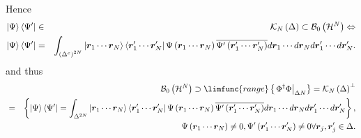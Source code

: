 \documentclass[12pt]{article}
\begin{document}
Hence%
\begin{eqnarray}
\left\vert \Psi \right\rangle \left\langle \Psi ^{\prime }\right\vert  &\in &%
\mathcal{K}_{N}\left( \Delta \right) \subset \mathcal{B}_{0}\left( \mathcal{H%
}^{N}\right) \Leftrightarrow   \notag \\
\left\vert \Psi \right\rangle \left\langle \Psi ^{\prime }\right\vert 
&=&\int_{\left( \Delta ^{c}\right) ^{2N}}\left\vert \boldsymbol{r}_{1}\cdots 
\boldsymbol{r}_{N}\right\rangle \left\langle \boldsymbol{r}_{1}^{\prime
}\cdots \boldsymbol{r}_{N}^{\prime }\right\vert \Psi \left( \boldsymbol{r}%
_{1}\cdots \boldsymbol{r}_{N}\right) \overline{\Psi ^{\prime }\left( 
\boldsymbol{r}_{1}^{\prime }\cdots \boldsymbol{r}_{N}^{\prime }\right) }d%
\boldsymbol{r}_{1}\cdots d\boldsymbol{r}_{N}d\boldsymbol{r}_{1}^{\prime
}\cdots d\boldsymbol{r}_{N}^{\prime }.
\end{eqnarray}%
and thus 
\begin{eqnarray}
&&\mathcal{B}_{0}\left( \mathcal{H}^{N}\right) \supset \limfunc{range}%
\left\{ \left. \Phi ^{\dagger }\Phi \right\vert _{\Delta N}\right\} =%
\mathcal{K}_{N}\left( \Delta \right) ^{\bot }  \notag \\
&=&\left\{ \left\vert \Psi \right\rangle \left\langle \Psi ^{\prime
}\right\vert =\int_{\Delta ^{2N}}\left\vert \boldsymbol{r}_{1}\cdots 
\boldsymbol{r}_{N}\right\rangle \left\langle \boldsymbol{r}_{1}^{\prime
}\cdots \boldsymbol{r}_{N}^{\prime }\right\vert \Psi \left( \boldsymbol{r}%
_{1}\cdots \boldsymbol{r}_{N}\right) \overline{\Psi ^{\prime }\left( 
\boldsymbol{r}_{1}^{\prime }\cdots \boldsymbol{r}_{N}^{\prime }\right) }d%
\boldsymbol{r}_{1}\cdots d\boldsymbol{r}_{N}d\boldsymbol{r}_{1}^{\prime
}\cdots d\boldsymbol{r}_{N}^{\prime }\right\} ,  \notag \\
&&\Psi \left( \boldsymbol{r}_{1}\cdots \boldsymbol{r}_{N}\right) \neq 0,\Psi
^{\prime }\left( \boldsymbol{r}_{1}^{\prime }\cdots \boldsymbol{r}%
_{N}^{\prime }\right) \neq 0\forall \boldsymbol{r}_{j},\boldsymbol{r}%
_{j}^{\prime }\in \Delta .
\end{eqnarray}
\end{document}
